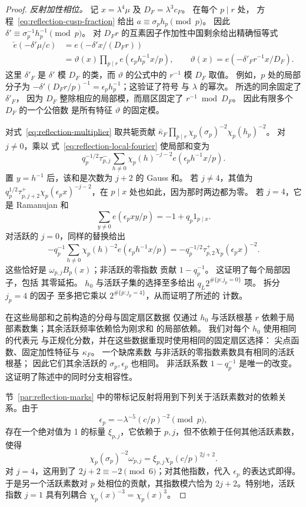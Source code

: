 \documentclass[11pt,a4paper]{article}
\numberwithin{equation}{section}
\numberwithin{figure}{section}
\theoremstyle{definition}
\theoremstyle{remark}
\begin{document}
\begin{proof}
\emph{反射加性相位。}
记 $x=\lambda^4\mu$ 及 $D_F=\lambda^3c_F$。 在每个 $p\mid r$ 处，
方程~\eqref{eq:reflection-cusp-fraction} 给出
$a\equiv\sigma_ph_p\pmod p$。 因此
$\delta'\equiv\sigma_p^{-1}h_p^{-1}\pmod p$。 对
$D_Fr$ 的互素因子作加性中国剩余给出精确恒等式
\begin{equation}\label{eq:reflection-additive-phase}
 \begin{split}
 \check e(-\delta'\mu/c)
 &=e(-\delta'x/(D_Fr))\\
 &=\vartheta(x)\prod_{p\mid r}e(\epsilon_ph_p^{-1}x/p),
 \qquad
 \vartheta(x)=e(-\delta'_F r^{-1}x/D_F).
 \end{split}
\end{equation}
这里 $\delta'_F$ 是 $\delta'$ 模 $D_F$ 的类，而
$\vartheta$ 的公式中的 $r^{-1}$ 模 $D_F$ 取值。
例如，$p$ 处的局部分子为
$-\delta'(D_Fr/p)^{-1}=\epsilon_ph_p^{-1}$；这验证了符号
与 $\lambda$ 的幂次。 所选的同余固定了 $\delta'_F$，
因为 $D_F$ 整除相应的局部模，而扇区固定了
$r^{-1}\bmod D_F$。 因此有限多个 $D_F$ 的一个公倍数
是所有特征 $\vartheta$ 的固定模。

对式~\eqref{eq:reflection-multiplier} 取共轭贡献
$\bar\kappa_F\prod_{p\mid r}\chi_p(\sigma_p)^{-2}\chi_p(h_p)^{-2}$。
对 $j\ne0$，乘以
式~\eqref{eq:reflection-local-fourier} 使局部和变为
\[
 q_p^{-1/2}\tau_{p,j}^{-}
 \sum_{h\ne0}\chi_p(h)^{-j-2}e(\epsilon_ph^{-1}x/p).
\]
置 $y=h^{-1}$ 后，该和是次数为 $j+2$ 的 Gauss 和。
若 $j\ne4$，其值为
$q_p^{1/2}\tau_{p,j+2}^{+}\chi_p(\epsilon_px)^{-j-2}$，在
$p\mid x$ 处也如此，因为那时两边都为零。 若 $j=4$，它是
Ramanujan 和
\[
 \sum_{y\ne0}e(\epsilon_pxy/p)=-1+q_p1_{p\mid x}.
\]
对活跃的 $j=0$，同样的替换给出
\[
 -q_p^{-1}\sum_{h\ne0}\chi_p(h)^{-2}e(\epsilon_ph^{-1}x/p)
 =-q_p^{-1/2}\tau_{p,2}^{+}\chi_p(\epsilon_px)^{-2}.
\]
这些恰好是 $\omega_{p,j}B_p(x)$；非活跃的零指数
贡献 $1-q_p^{-1}$。 这证明了每个局部因子，包括
其零延拓。 $h_0$ 与活跃子集的选择至多给出
$q_L2^{\#\{p:j_p=0\}}$ 项。 拆分 $j_p=4$ 的因子
至多把它乘以 $2^{\#\{p:j_p=4\}}$，从而证明了所述的
计数。

在这些局部和之前构造的分母与固定扇区数据
仅通过 $h_0$ 与活跃根基
$r$ 依赖于局部素数集；其余活跃频率依赖恰为刚求和
的局部依赖。 我们对每个 $h_0$ 使用相同的代表元
与正规化分数，并在这些数据重现时使用相同的固定扇区选择：
尖点函数、固定加性特征与 $\kappa_F$。 一个缺席素数
与非活跃的零指数素数具有相同的活跃根基；
因此它们其余活跃的 $\sigma_p,\epsilon_p$ 也相同。
非活跃系数 $1-q_p^{-1}$ 是唯一的改变。
这证明了陈述中的同时分支相容性。

节~\ref{par:reflection-marks} 中的带标记反射将用到下列关于活跃素数对的依赖关系。由于
\[
 \epsilon_p=-\lambda^{-5}(c/p)^{-2}\pmod p,
\]
存在一个绝对值为 1 的标量 $\xi_{p,j}$，它依赖于 $p,j$，但不依赖于任何其他活跃素数，使得
\begin{equation}\label{eq:reflection-cross-prime-phase}
 \chi_p(\sigma_p)^{-2}\omega_{p,j}
       =\xi_{p,j}\chi_p(c/p)^{2j+2}.
\end{equation}
对 $j=4$，这用到了 $2j+2\equiv-2\pmod6$；对其他指数，代入 $\epsilon_p$ 的表达式即得。
于是另一个活跃素数对 $p$ 处相位的贡献，其指数模六恰为 $2j+2$。特别地，活跃指数
$j=1$ 具有列耦合 $\chi_p(x)^{-3}=\chi_p(x)^3$。


\end{proof}
\end{document}
